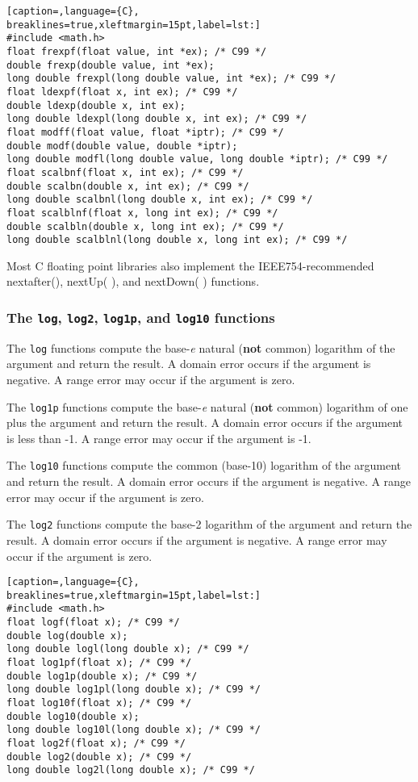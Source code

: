 \lstset{basicstyle=\scriptsize, numbers=left, captionpos=b, tabsize=4}
\begin{lstlisting}[caption=,language={C},
breaklines=true,xleftmargin=15pt,label=lst:]
#include <math.h>
float frexpf(float value, int *ex); /* C99 */
double frexp(double value, int *ex);
long double frexpl(long double value, int *ex); /* C99 */
float ldexpf(float x, int ex); /* C99 */
double ldexp(double x, int ex);
long double ldexpl(long double x, int ex); /* C99 */
float modff(float value, float *iptr); /* C99 */
double modf(double value, double *iptr); 
long double modfl(long double value, long double *iptr); /* C99 */
float scalbnf(float x, int ex); /* C99 */
double scalbn(double x, int ex); /* C99 */
long double scalbnl(long double x, int ex); /* C99 */
float scalblnf(float x, long int ex); /* C99 */
double scalbln(double x, long int ex); /* C99 */
long double scalblnl(long double x, long int ex); /* C99 */
\end{lstlisting}

Most C floating point libraries also implement the IEEE754-recommended
nextafter(), nextUp( ), and nextDown( ) functions.

\subsubsection{The \texttt{log}, \texttt{log2}, \texttt{log1p}, and
\texttt{log10} functions}
The \texttt{log} functions compute the base-\emph{e} natural (\textbf{not}
common) logarithm of the argument and return the result. A domain error occurs
if the argument is negative. A range error may occur if the argument is zero.

The \texttt{log1p} functions compute the base-\emph{e} natural (\textbf{not}
common) logarithm of one plus the argument and return the result. A domain
error occurs if the argument is less than -1. A range error may occur if the
argument is -1.

The \texttt{log10} functions compute the common (base-10) logarithm of the
argument and return the result. A domain error occurs if the argument is
negative. A range error may occur if the argument is zero.

The \texttt{log2} functions compute the base-2 logarithm of the argument and
return the result. A domain error occurs if the argument is negative. A range
error may occur if the argument is zero.
\lstset{basicstyle=\scriptsize, numbers=left, captionpos=b, tabsize=4}
\begin{lstlisting}[caption=,language={C},
breaklines=true,xleftmargin=15pt,label=lst:]
#include <math.h>
float logf(float x); /* C99 */
double log(double x);
long double logl(long double x); /* C99 */
float log1pf(float x); /* C99 */
double log1p(double x); /* C99 */
long double log1pl(long double x); /* C99 */
float log10f(float x); /* C99 */
double log10(double x);
long double log10l(long double x); /* C99 */
float log2f(float x); /* C99 */
double log2(double x); /* C99 */
long double log2l(long double x); /* C99 */
\end{lstlisting}

